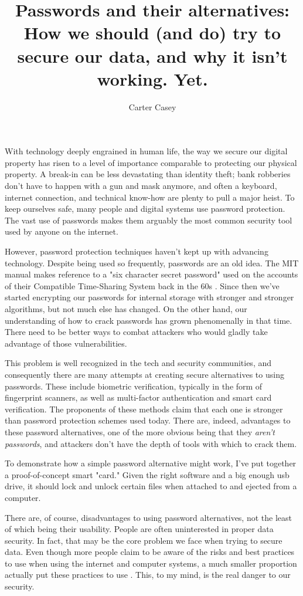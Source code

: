 \documentclass[12pt]{apa6}
\title{Passwords and their alternatives: How we should (and do) try to secure our data, and why it isn't working. Yet.}
\author{Carter Casey}
\affiliation{Mentor: Ming Chow \\ Tufts University Department of Computer Science}
\begin{document}
\maketitle
\doublespacing
With technology deeply engrained in human life, the way we secure our digital property has risen to a level of importance comparable to protecting our physical property. A break-in can be less devastating than identity theft; bank robberies don't have to happen with a gun and mask anymore, and often a keyboard, internet connection, and technical know-how are plenty to pull a major heist. To keep ourselves safe, many people and digital systems use password protection. The vast use of passwords makes them arguably the most common security tool used by anyone on the internet.

However, password protection techniques haven't kept up with advancing technology. Despite being used so frequently, passwords are an old idea. The MIT manual makes reference to a "six character secret password" used on the accounts of their Compatible Time-Sharing System back in the 60s \parencite{mit65}. Since then we've started encrypting our passwords for internal storage with stronger and stronger algorithms, but not much else has changed. On the other hand, our understanding of how to crack passwords has grown phenomenally in that time. There need to be better ways to combat attackers who would gladly take advantage of those vulnerabilities.

This problem is well recognized in the tech and security communities, and consequently there are many attempts at creating secure alternatives to using passwords. These include biometric verification, typically in the form of fingerprint scanners, as well as multi-factor authentication and smart card verification. The proponents of these methods claim that each one is stronger than password protection schemes used today. There are, indeed, advantages to these password alternatives, one of the more obvious being that they \textit{aren't passwords}, and attackers don't have the depth of tools with which to crack them.

To demonstrate how a simple password alternative might work, I've put together a proof-of-concept smart "card." Given the right software and a big enough usb drive, it should lock and unlock certain files when attached to and ejected from a computer.

There are, of course, disadvantages to using password alternatives, not the least of which being their usability. People are often uninterested in proper data security. In fact, that may be the core problem we face when trying to secure data. Even though more people claim to be aware of the risks and best practices to use when using the internet and computer systems, a much smaller proportion actually put these practices to use \parencite{mcafee11}. This, to my mind, is the real danger to our security.
\end{document}
